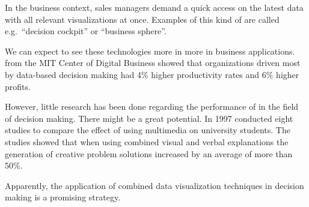 In the business context, sales managers demand a quick access on the latest data with all relevant visualizations at once.
Examples of this kind of \dss{} are called e.g.\ ``decision cockpit'' or ``business sphere''\cite{Davenport2013}.

We can expect to see these technologies more in more in business applications.
\textcite{McAfee2012} from the MIT Center of Digital Business showed that organizations driven most by data-based decision making had 4\% higher productivity rates and 6\% higher profits.

However, little research has been done regarding the performance of \cmvs{} in the field of decision making.
There might be a great potential.
In 1997 \textcite{Mayer1997} conducted eight studies to compare the effect of using multimedia on university students.
The studies showed that when using combined visual and verbal explanations the generation of creative problem solutions increased by an average of more than 50\%.

Apparently, the application of combined data visualization techniques in decision making is a promising strategy.

